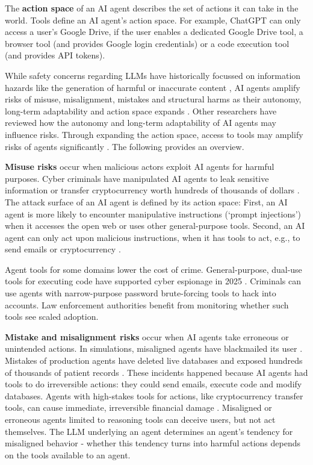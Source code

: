 \documentclass[manuscript,screen,nonacm,oneside]{acmart}
\begin{document}
The \textbf{action space} of an AI agent describes the set of actions it can take in the world. Tools define an AI agent's action space. For example, ChatGPT can only access a user's Google Drive, if the user enables a dedicated Google Drive tool, a browser tool (and provides Google login credentials) or a code execution tool (and provides API tokens).

While safety concerns regarding LLMs have historically focussed on information hazards like the generation of harmful or inaccurate content \citep{bommasani2021opportunities}, AI agents amplify risks of misuse, misalignment, mistakes and structural harms as their autonomy, long-term adaptability and action space expands \citep{shah2025approach, bengio2025superintelligent}. 
Other researchers have reviewed how the autonomy \citep{cihon2024chilling} and long-term adaptability \citep{chan2023harms} of AI agents may influence risks. Through expanding the action space, access to tools may amplify risks of agents significantly \citep{imda}. The following provides an overview.

\textbf{Misuse risks} occur when malicious actors exploit AI agents for harmful purposes. Cyber criminals have manipulated AI agents to leak sensitive information or transfer cryptocurrency worth hundreds of thousands of dollars \citep{reddy2025echoleakrealworldzeroclickprompt, decryptAiXBTToken, akinciborgHackingCrypto, deng2025ai}. The attack surface of an AI agent is defined by its action space: First, an AI agent is more likely to encounter manipulative instructions (`prompt injections') when it accesses the open web or uses other general-purpose tools. Second, an AI agent can only act upon malicious instructions, when it has tools to act, e.g., to send emails or cryptocurrency \citep{mo2025attractive, hou2025modelcontextprotocolmcp, gan2024navigating}. 

Agent tools for some domains lower the cost of crime. General-purpose, dual-use tools for executing code have supported cyber espionage in 2025 \citep{anthropicDisruptingFirst}. Criminals can use agents with narrow-purpose password brute-forcing tools to hack into accounts. Law enforcement authorities benefit from monitoring whether such tools see scaled adoption. 

\textbf{Mistake and misalignment risks} occur when AI agents take erroneous or unintended actions. In simulations, misaligned agents have blackmailed its user \citep{anthropicAgenticMisalignment}. Mistakes of production agents have deleted live databases and exposed hundreds of thousands of patient records \citep{fortuneAIpoweredCoding, abaSleepwalkingInto}. These incidents happened because AI agents had tools to do irreversible actions: they could send emails, execute code and modify databases. Agents with high-stakes tools for actions, like cryptocurrency transfer tools, can cause immediate, irreversible financial damage \citep{hammond2025multiagentrisksadvancedai}. Misaligned or erroneous agents limited to reasoning tools can deceive users, but not act themselves. The LLM underlying an agent determines an agent's tendency for misaligned behavior - whether this tendency turns into harmful actions depends on the tools available to an agent.  
\end{document}
